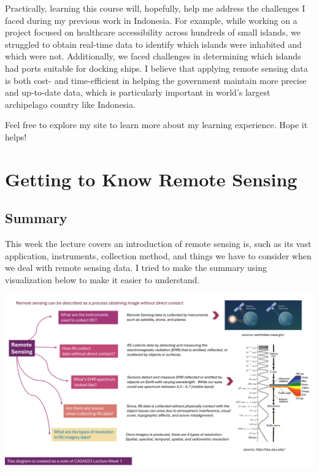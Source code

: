 \documentclass[
  letterpaper,
  DIV=11,
  numbers=noendperiod]{scrreprt}
\begin{document}
Practically, learning this course will, hopefully, help me address the
challenges I faced during my previous work in Indonesia. For example,
while working on a project focused on healthcare accessibility across
hundreds of small islands, we struggled to obtain real-time data to
identify which islands were inhabited and which were not. Additionally,
we faced challenges in determining which islands had ports suitable for
docking ships. I believe that applying remote sensing data is both cost-
and time-efficient in helping the government maintain more precise and
up-to-date data, which is particularly important in world's largest
archipelago country like Indonesia.

Feel free to explore my site to learn more about my learning experience.
Hope it helps!


\hypertarget{getting-to-know-remote-sensing}{%
\chapter{Getting to Know Remote
Sensing}\label{getting-to-know-remote-sensing}}

\hypertarget{summary}{%
\section{\texorpdfstring{\textbf{Summary}}{Summary}}\label{summary}}

This week the lecture covers an introduction of remote sensing is, such
as its vast application, instruments, collection method, and things we
have to consider when we deal with remote sensing data. I tried to make
the summary using visualization below to make it easier to understand.

\includegraphics{images/clipboard-1084697230.png}
\end{document}
